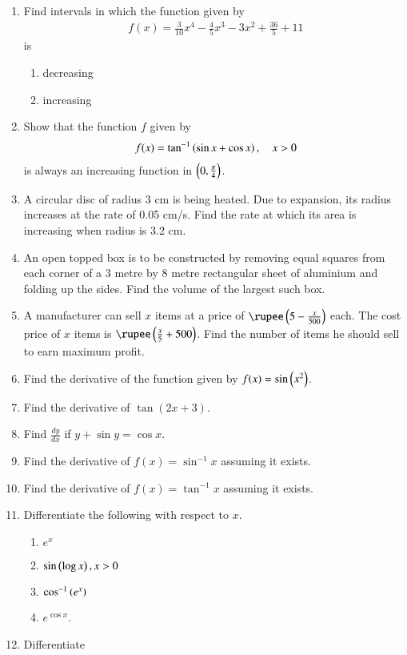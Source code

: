 \begin{enumerate}[label=\arabic*.,ref=\thesubsection.\theenumi]
%
\item Find intervals in which the function given by 
\begin{align}
f(x) = \frac{3}{10}x^4 - \frac{4}{5}x^3-3x^2+\frac{36}{5} + 11 
\end{align}
%
is
%
\begin{enumerate}
\item decreasing 
\item increasing 
\end{enumerate}
%
\item Show that the function $f$ given by 
%
\begin{align}
f(x) = \tan^{-1}\left(\sin x + \cos x\right), \quad x > 0
\end{align}
%
is always an increasing function in $\left(0,\frac{\pi}{4}\right)$.
%
\item  A circular disc of radius 3 cm is being heated. Due to expansion, its radius increases at the rate of 0.05 cm/s. Find the rate at which its area is increasing when radius is 3.2 cm.
%
\item An open topped box is to be constructed by removing equal squares from each corner of a 3 metre by 8 metre rectangular sheet of aluminium and folding up the sides. Find the volume of the largest such box.
%
\item A manufacturer can sell $x$ items at a price of $\rupee \brak{5-\frac{x}{500}}$ each.  The cost price of $x$ items is $\rupee 
\brak{\frac{x}{5}+500}$.  Find the number of items he should sell to earn maximum profit.
%
\item Find the derivative of the function given by $f(x) = \sin\left(x^2\right)$.
\item Find the derivative of $\tan (2x + 3)$.
\item Find $\frac{dy}{dx}$ if $y + \sin y = \cos x$.
\item Find the derivative of $f(x) = \sin ^{-1}x$ assuming it exists.
\item Find the derivative of $f(x) = \tan ^{-1}x$ assuming it exists.
\item Differentiate the following with respect to $x$.
%
\begin{enumerate}
\item  $e^x$
\item  $\sin \left(\log x\right), x > 0$
\item $\cos ^{-1}\left(e^x\right)$
\item $e^{\cos x}$.
\end{enumerate}
%
\item Differentiate

\end{enumerate}

